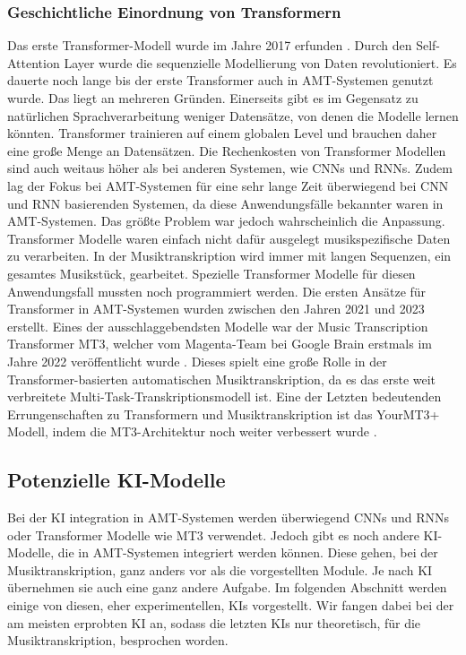 \subsubsection{Geschichtliche Einordnung von Transformern}
Das erste Transformer-Modell wurde im Jahre 2017 erfunden \cite{vaswani2017attention}.
Durch den Self-Attention Layer wurde die sequenzielle Modellierung von Daten revolutioniert.
Es dauerte noch lange bis der erste Transformer auch in AMT-Systemen genutzt wurde.
Das liegt an mehreren Gründen.
Einerseits gibt es im Gegensatz zu natürlichen Sprachverarbeitung weniger Datensätze, von denen die Modelle lernen könnten.
Transformer trainieren auf einem globalen Level und brauchen daher eine große Menge an Datensätzen.
Die Rechenkosten von Transformer Modellen sind auch weitaus höher als bei anderen Systemen, wie CNNs und RNNs.
Zudem lag der Fokus bei AMT-Systemen für eine sehr lange Zeit überwiegend bei CNN und RNN basierenden Systemen,
da diese Anwendungsfälle bekannter waren in AMT-Systemen.
Das größte Problem war jedoch wahrscheinlich die Anpassung.
Transformer Modelle waren einfach nicht dafür ausgelegt musikspezifische Daten zu verarbeiten.
In der Musiktranskription wird immer mit langen Sequenzen, ein gesamtes Musikstück, gearbeitet.
Spezielle Transformer Modelle für diesen Anwendungsfall mussten noch programmiert werden.
Die ersten Ansätze für Transformer in AMT-Systemen wurden zwischen den Jahren 2021 und 2023 erstellt.
Eines der ausschlaggebendsten Modelle war der Music Transcription Transformer MT3,
welcher vom Magenta-Team bei Google Brain erstmals im Jahre 2022 veröffentlicht wurde \cite{gardner2021mt3}.
Dieses spielt eine große Rolle in der Transformer-basierten automatischen Musiktranskription,
da es das erste weit verbreitete Multi-Task-Transkriptionsmodell ist.
Eine der Letzten bedeutenden Errungenschaften zu Transformern und Musiktranskription ist das
YourMT3+ Modell, indem die MT3-Architektur noch weiter verbessert wurde \cite{chang2024yourmt3+}.

\subsection{Potenzielle KI-Modelle}
Bei der KI integration in AMT-Systemen werden überwiegend CNNs und RNNs oder Transformer Modelle wie MT3 verwendet.
Jedoch gibt es noch andere KI-Modelle, die in AMT-Systemen integriert werden können.
Diese gehen, bei der Musiktranskription, ganz anders vor als die vorgestellten Module.
Je nach KI übernehmen sie auch eine ganz andere Aufgabe.
Im folgenden Abschnitt werden einige von diesen, eher experimentellen, KIs vorgestellt.
Wir fangen dabei bei der am meisten erprobten KI an,
sodass die letzten KIs nur theoretisch, für die Musiktranskription, besprochen worden.


